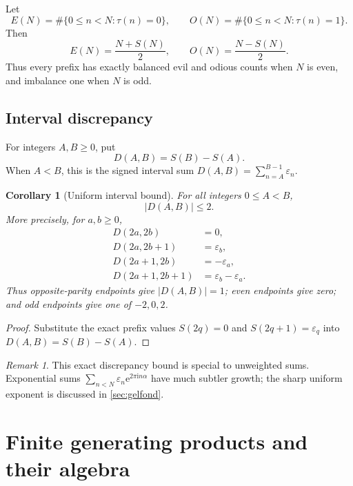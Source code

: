 \documentclass[11pt,oneside]{article}
\newtheorem{corollary}[theorem]{Corollary}
\theoremstyle{definition}
\theoremstyle{remark}
\newtheorem{remark}[theorem]{Remark}
\newcommand{\e}{\mathrm e}
\newcommand{\ii}{\mathrm i}
\newcommand{\eps}{\varepsilon}
\begin{document}
Let
\[
 E(N)=\#\{0\le n<N:\tau(n)=0\},
 \qquad
 O(N)=\#\{0\le n<N:\tau(n)=1\}.
\]
Then
\begin{equation}\label{eq:evil-odious-counts}
 E(N)=\frac{N+S(N)}2,
 \qquad
 O(N)=\frac{N-S(N)}2.
\end{equation}
Thus every prefix has exactly balanced evil and odious counts when $N$ is
even, and imbalance one when $N$ is odd.

\subsection{Interval discrepancy}

For integers $A,B\ge0$, put
\[
 D(A,B)=S(B)-S(A).
\]
When $A<B$, this is the signed interval sum
$D(A,B)=\sum_{n=A}^{B-1}\eps_n$.

\begin{corollary}[Uniform interval bound]\label{cor:interval-discrepancy}
For all integers $0\le A<B$,
\begin{equation}\label{eq:interval-discrepancy}
 |D(A,B)|\le2.
\end{equation}
More precisely, for $a,b\ge0$,
\begin{align}
 D(2a,2b)&=0,\label{eq:interval-even-even}\\
 D(2a,2b+1)&=\eps_b,\label{eq:interval-even-odd}\\
 D(2a+1,2b)&=-\eps_a,\label{eq:interval-odd-even}\\
 D(2a+1,2b+1)&=\eps_b-\eps_a.\label{eq:interval-odd-odd}
\end{align}
Thus opposite-parity endpoints give $|D(A,B)|=1$; even endpoints give zero;
and odd endpoints give one of $-2,0,2$.
\end{corollary}

\begin{proof}
Substitute the exact prefix values
$S(2q)=0$ and $S(2q+1)=\eps_q$ into $D(A,B)=S(B)-S(A)$.
\end{proof}

\begin{remark}
This exact discrepancy bound is special to unweighted sums.  Exponential sums
$\sum_{n<N}\eps_n\e^{2\pi\ii n\alpha}$ have much subtler growth; the sharp
uniform exponent is discussed in \cref{sec:gelfond}.
\end{remark}

\section{Finite generating products and their algebra}
\end{document}

